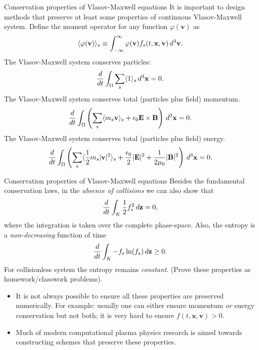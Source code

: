 \documentclass[pdf]{beamer}
\newcommand{\mvec}[1]{\mathbf{#1}}
\newcommand{\dtv}{\thinspace d^3\mvec{v}}
\newcommand{\dtx}{\thinspace d^3\mvec{x}}
\theoremstyle{definition}
\begin{document}
\begin{frame}{Conservation properties of Vlasov-Maxwell equations}
  \small%
  It is important to design methods that preserve at least some
  properties of continuous Vlasov-Maxwell system. Define the moment
  operator for any function $\varphi(\mvec{v})$ as
  \begin{align*}
    \langle \varphi(\mvec{v}) \rangle_s
    \equiv
    \int_{-\infty}^{\infty} \varphi(\mvec{v}) f_s(t,\mvec{x},\mvec{v}) \dtv.
    \label{eq:momentDefinition}
  \end{align*}
  The Vlasov-Maxwell system conserves particles:
  \begin{align*}
    \frac{d}{dt}\int_\Omega \sum_s \langle 1 \rangle_s \dtx = 0.
  \end{align*}
  The Vlasov-Maxwell system conserves total (particles plus field)
  momentum.
  \begin{align*}
    \frac{d}{dt} \int_\Omega \left( \sum_s \langle m_s\mvec{v} \rangle_s + \epsilon_0 \mvec{E}\times\mvec{B} \right) \dtx = 0.
  \end{align*}
  The Vlasov-Maxwell system conserves total (particles plus field) energy.
  \begin{align*}
    \frac{d}{dt} \int_\Omega \left(\sum_s \langle \frac{1}{2} m_s |\mvec{v}|^2 \rangle_s + \frac{\epsilon_0}{2} |\mvec{E}|^2 + \frac{1}{2\mu_0} |\mvec{B}|^2 \right) \dtx = 0.
  \end{align*}
\end{frame}

\begin{frame}{Conservation properties of Vlasov-Maxwell equations}
  \small
  Besides the fundamental conservation laws, in the \emph{absence of
    collisions} we can also show that
  \begin{align*}
    \frac{d}{dt}\int_K \frac{1}{2} f_s^2\thinspace d\mvec{z} = 0,
  \end{align*}
  where the integration is taken over the complete phase-space. Also,
  the entropy is a \emph{non-decreasing} function of time
  \begin{align*}
    \frac{d}{dt}\int_K -f_s \ln(f_s) \thinspace d\mvec{z} \ge 0.
  \end{align*}
  For collisionless system the entropy remains \emph{constant}.
  (Prove these properties as homework/classwork problems).
  \begin{itemize}
  \item It is not always possible to ensure all these properties are
    preserved numerically. For example: usually one can either ensure
    momentum \emph{or} energy conservation but not both; it is very
    hard to ensure $f(t,\mvec{x},\mvec{v})>0$.
  \item Much of modern computational plasma physics research is aimed
    towards constructing schemes that preserve these properties.
  \end{itemize}
\end{frame}
\end{document}
